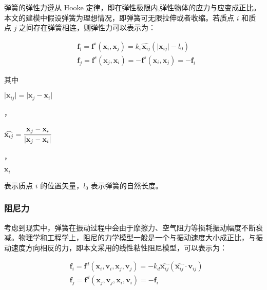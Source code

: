 \documentclass[UTF8]{ctexart}
\begin{document}
弹簧的弹性力遵从 Hooke 定律，即在弹性极限内,弹性物体的应力与应变成正比。本文的建模中假设弹簧为理想情况，即弹簧可无限拉伸或者收缩。若质点 $i$ 和质点 $j$ 之间存在弹簧相连，则弹性力可以表示为：

\begin{large}
\begin{equation}
\begin{split}
&\mathbf{f}_i = \mathbf{f}^s(\mathbf{x}_i, \mathbf{x}_j)=k_s \widehat{\mathbf{x}_{ij}} (\lvert \mathbf{x}_{ij} \rvert - l_0) \\
&\mathbf{f}_j = \mathbf{f}^s(\mathbf{x}_j, \mathbf{x}_i)=-\mathbf{f}^s(\mathbf{x}_i, \mathbf{x}_j)=-\mathbf{f}_i
\end{split}
\end{equation}
\end{large}

其中 \begin{large} $\lvert \mathbf{x}_{ij} \rvert = \lvert \mathbf{x}_{j} - \mathbf{x}_{i} \rvert$ \end{large}，\begin{large}$\widehat{\mathbf{x}_{ij}} = \cfrac{\mathbf{x}_{j} - \mathbf{x}_{i}}{ \lvert \mathbf{x}_{j} - \mathbf{x}_{i} \rvert}$ \end{large}，\begin{large}$ \mathbf{x}_i $\end{large} 表示质点 $i$ 的位置矢量，$l_0$ 表示弹簧的自然长度。 \par

\subsubsection{阻尼力}

考虑到现实中，弹簧在振动过程中会由于摩擦力、空气阻力等损耗振动幅度不断衰减。物理学和工程学上，阻尼的力学模型一般是一个与振动速度大小成正比，与振动速度方向相反的力，即本文采用的线性粘性阻尼模型，可以表示为：

\begin{large}
\begin{equation}
\begin{split}
&\mathbf{f}_i = \mathbf{f}^d(\mathbf{x}_i, \mathbf{v}_i, \mathbf{x}_j, \mathbf{v}_j)=-k_d \widehat{\mathbf{x}_{ij}} (\widehat{\mathbf{x}_{ij}} \cdot \mathbf{v}_{ij}) \\
&\mathbf{f}_j = \mathbf{f}^d(\mathbf{x}_j, \mathbf{v}_j, \mathbf{x}_i, \mathbf{v}_i)=-\mathbf{f}_i
\end{split}
\end{equation}
\end{large}
\end{document}
